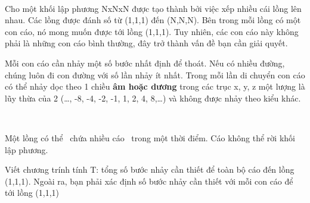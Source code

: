  

Cho một khối lập phương NxNxN được tạo thành bởi việc xếp nhiều cái lồng lên nhau. Các lồng được đánh số từ (1,1,1) đến (N,N,N). Bên trong mỗi lồng có một con cáo, nó mong muốn được tới lồng (1,1,1). Tuy nhiên, các con cáo này không phải là những con cáo bình thường, đây trở thành vấn đề bạn cần giải quyết.

Mỗi con cáo cần nhảy một số bước nhất định để thoát. Nếu có nhiều đường, chúng luôn đi con đường với số lần nhảy ít nhất. Trong mỗi lần di chuyển con cáo có thể nhảy dọc theo 1 chiều \textbf{ âm hoặc dương } trong các trục x, y, z một lượng là lũy thừa của 2 (…, -8, -4, -2, -1, 1, 2, 4, 8,…) và không được nhảy theo kiểu khác.

 

Một lồng có thể  chứa nhiều cáo  trong một thời điểm. Cáo không thể rời khối lập phương.

Viết chương trính tính T: tổng số bước nhảy cần thiết để toàn bộ cáo đến lồng (1,1,1). Ngoài ra, bạn phải xác định số bước nhảy cần thiết với mỗi con cáo để tới lồng (1,1,1)

\